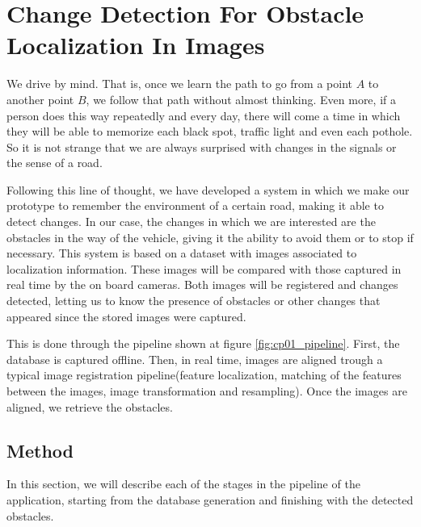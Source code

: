 
\graphicspath{{./images/chapter01/bmps/}{./images/chapter01/vects/}{./images/chapter01/}}

\chapter{Change Detection For Obstacle Localization In Images}\label{ch:chapter01}

We drive by mind. That is, once we learn the path to go from a point $A$ to another point $B$, we follow that path without almost thinking. Even more, if a person does this way repeatedly and every day, there will come a time in which they will be able to memorize each black spot, traffic light and even each pothole. So it is not strange that we are always surprised with changes in the signals or the sense of a road.

Following this line of thought, we have developed a system in which we make our prototype to remember the environment of a certain road, making it able to detect changes. In our case, the changes in which we are interested are the obstacles in the way of the vehicle, giving it the ability to avoid them or to stop if necessary. This system is based on a dataset with images associated to localization information. These images will be compared with those captured in real time by the on board cameras. Both images will be registered and changes detected, letting us to know the presence of obstacles or other changes that appeared since the stored images were captured.

This is done through the pipeline shown at figure \ref{fig:cp01_pipeline}. First, the database is captured offline. Then, in real time, images are aligned trough a typical image registration pipeline(feature localization, matching of the features between the images, image transformation and resampling). Once the images are aligned, we retrieve the obstacles.

\section{Method}\label{ch:chapter01_01}

In this section, we will describe each of the stages in the pipeline of the application, starting from the database generation and finishing with the detected obstacles.

